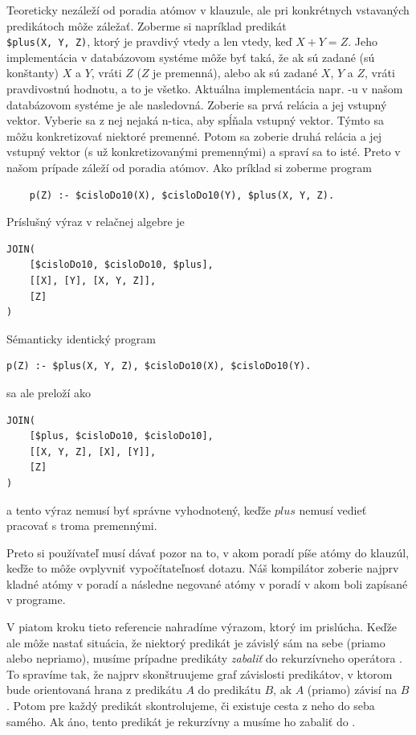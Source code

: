 \begin{note}
    Teoreticky nezáleží od poradia atómov v klauzule, ale pri konkrétnych vstavaných predikátoch
    môže záležať. Zoberme si napríklad predikát \\\verb|$plus(X, Y, Z)|, ktorý je pravdivý vtedy a
    len vtedy, keď $X + Y = Z$. Jeho implementácia v databázovom systéme môže byť taká, že ak sú
    zadané (sú konštanty) $X$ a $Y$, vráti $Z$ ($Z$ je premenná), alebo ak sú zadané $X$, $Y$ a $Z$,
    vráti pravdivostnú hodnotu, a to je všetko. Aktuálna implementácia napr. \JOIN-u v našom
    databázovom systéme je ale nasledovná. Zoberie sa prvá relácia a jej vstupný vektor. Vyberie sa
    z nej nejaká n-tica, aby spĺňala vstupný vektor. Týmto sa môžu konkretizovať niektoré premenné.
    Potom sa zoberie druhá relácia a jej vstupný vektor (s už konkretizovanými premennými) a spraví
    sa to isté. Preto v našom prípade záleží od poradia atómov. Ako príklad si zoberme program
\begin{verbatim}
    p(Z) :- $cisloDo10(X), $cisloDo10(Y), $plus(X, Y, Z).
\end{verbatim}
    Príslušný výraz v relačnej algebre je
\begin{verbatim}
JOIN(
    [$cisloDo10, $cisloDo10, $plus],
    [[X], [Y], [X, Y, Z]],
    [Z]
)
\end{verbatim}
    Sémanticky identický program
\begin{verbatim}
p(Z) :- $plus(X, Y, Z), $cisloDo10(X), $cisloDo10(Y).
\end{verbatim}
    sa ale preloží ako
\begin{verbatim}
JOIN(
    [$plus, $cisloDo10, $cisloDo10],
    [[X, Y, Z], [X], [Y]],
    [Z]
)
\end{verbatim}
    a tento výraz nemusí byť správne vyhodnotený, keďže $plus$ nemusí vedieť pracovať s troma
    premennými.
    
    Preto si používateľ musí dávať pozor na to, v akom poradí píše atómy do klauzúl, keďže to môže
    ovplyvniť vypočítateľnosť dotazu. Náš kompilátor zoberie najprv kladné atómy v poradí a následne
    negované atómy v poradí v akom boli zapísané v programe.
\end{note}

\vline

V piatom kroku tieto referencie nahradíme výrazom, ktorý im prislúcha. Keďže
ale môže nastať situácia, že niektorý predikát je závislý sám na sebe (priamo alebo nepriamo),
musíme prípadne predikáty \textit{zabaliť} do rekurzívneho operátora \REC. To spravíme tak, že najprv
skonštruujeme graf závislosti predikátov, v ktorom bude orientovaná hrana z predikátu $A$ do
predikátu $B$, ak $A$ (priamo) závisí na $B$. Potom pre každý predikát skontrolujeme, či existuje
cesta z neho do seba samého. Ak áno, tento predikát je rekurzívny a musíme ho zabaliť do \REC.


